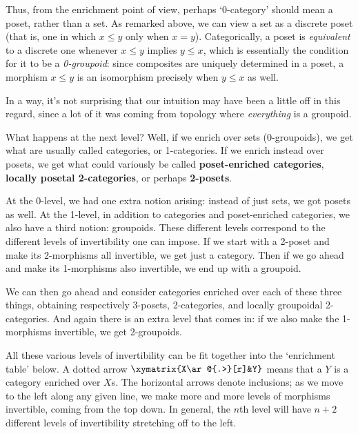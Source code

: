 \documentclass{amsart}
\begin{document}
Thus, from the enrichment point of view, perhaps `0-category' should
mean a poset, rather than a set.  As remarked above, we can view a set
as a discrete poset (that is, one in which $x\le y$ only when $x=y$).
Categorically, a poset is \emph{equivalent} to a discrete one whenever
$x\le y$ implies $y\le x$, which is essentially the condition for it
to be a \emph{0-groupoid}: since composites are uniquely determined in
a poset, a morphism $x\le y$ is an isomorphism precisely when $y\le x$
as well.

In a way, it's not surprising that our intuition may have been a
little off in this regard, since a lot of it was coming from topology
where \emph{everything} is a groupoid.

What happens at the next level?  Well, if we enrich over sets
(0-groupoids), we get what are usually called categories, or
1-categories.  If we enrich instead over posets, we get what could
variously be called \textbf{poset-enriched categories}, \textbf{locally
  posetal 2-categories}, or perhaps \textbf{2-posets}.

At the 0-level, we had one extra notion arising: instead of just sets,
we got posets as well.  At the 1-level, in addition to categories and
poset-enriched categories, we also have a third notion: groupoids.
These different levels correspond to the different levels of
invertibility one can impose.  If we start with a 2-poset and make its
2-morphisms all invertible, we get just a category.  Then if we go
ahead and make its 1-morphisms also invertible, we end up with a
groupoid.

We can then go ahead and consider categories enriched over each of
these three things, obtaining respectively 3-posets, 2-categories, and
locally groupoidal 2-categories.  And again there is an extra level
that comes in: if we also make the 1-morphisms invertible, we get
2-groupoids.

All these various levels of invertibility can be fit together into the
`enrichment table' below.  A dotted arrow $\xymatrix{X\ar@{.>}[r]&Y}$
means that a $Y$ is a category enriched over $X$s.  The horizontal
arrows denote inclusions; as we move to the left along any given line,
we make more and more levels of morphisms invertible, coming from the
top down.  In general, the $n$th level will have $n+2$ different
levels of invertibility stretching off to the left.
\end{document}
